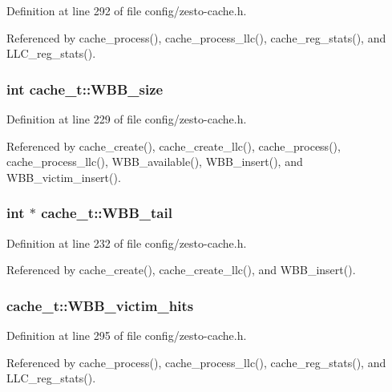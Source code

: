 Definition at line 292 of file config/zesto-cache.h.

Referenced by cache\_\-process(), cache\_\-process\_\-llc(), cache\_\-reg\_\-stats(), and LLC\_\-reg\_\-stats().
\subsubsection[{WBB\_\-size}]{\setlength{\rightskip}{0pt plus 5cm}int {\bf cache\_\-t::WBB\_\-size}}\label{structcache__t_e30b33cff209a8b0d14d7bee3f8cd8ef}




Definition at line 229 of file config/zesto-cache.h.

Referenced by cache\_\-create(), cache\_\-create\_\-llc(), cache\_\-process(), cache\_\-process\_\-llc(), WBB\_\-available(), WBB\_\-insert(), and WBB\_\-victim\_\-insert().
\subsubsection[{WBB\_\-tail}]{\setlength{\rightskip}{0pt plus 5cm}int $\ast$ {\bf cache\_\-t::WBB\_\-tail}}\label{structcache__t_aac8ffb779d8d0de8fa5b19ec0f4a549}




Definition at line 232 of file config/zesto-cache.h.

Referenced by cache\_\-create(), cache\_\-create\_\-llc(), and WBB\_\-insert().
\subsubsection[{WBB\_\-victim\_\-hits}]{ {\bf cache\_\-t::WBB\_\-victim\_\-hits}}\label{structcache__t_757dac19087b6b3f183e0c9a1b4365d8}




Definition at line 295 of file config/zesto-cache.h.

Referenced by cache\_\-process(), cache\_\-process\_\-llc(), cache\_\-reg\_\-stats(), and LLC\_\-reg\_\-stats().
